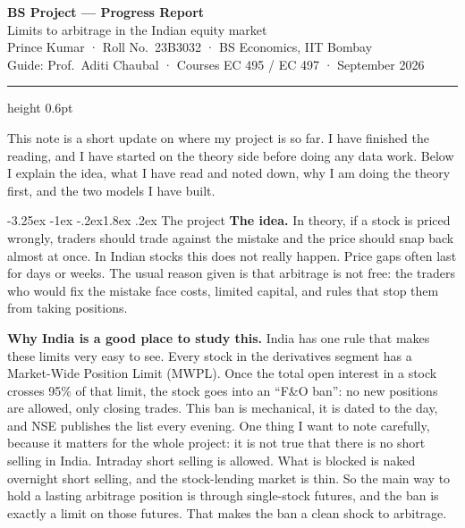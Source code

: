 \documentclass[11pt]{article}
\makeatletter
\renewcommand\section{\@startsection{section}{1}{\z@}%
  {-3.25ex \@plus -1ex \@minus -.2ex}{1.8ex \@plus.2ex}%
  {\normalfont\large\bfseries\color{owblue}}}
\makeatother
\begin{document}
\begin{center}
{\LARGE\bfseries\color{owblue} BS Project --- Progress Report}\\[4pt]
{\normalsize Limits to arbitrage in the Indian equity market}\\[6pt]
{\footnotesize Prince Kumar · Roll No.\ 23B3032 · BS Economics, IIT Bombay}\\[2pt]
{\footnotesize Guide: Prof.\ Aditi Chaubal · Courses EC 495 / EC 497 · September 2026}
\end{center}
\vspace{-4pt}
{\color{owgray}\hrule height 0.6pt}
\vspace{10pt}

\noindent This note is a short update on where my project is so far. I have finished the reading, and I have started on the theory side before doing any data work. Below I explain the idea, what I have read and noted down, why I am doing the theory first, and the two models I have built.

\section{The project}
\textbf{The idea.} In theory, if a stock is priced wrongly, traders should trade against the mistake and the price should snap back almost at once. In Indian stocks this does not really happen. Price gaps often last for days or weeks. The usual reason given is that arbitrage is not free: the traders who would fix the mistake face costs, limited capital, and rules that stop them from taking positions.

\textbf{Why India is a good place to study this.} India has one rule that makes these limits very easy to see. Every stock in the derivatives segment has a Market-Wide Position Limit (MWPL). Once the total open interest in a stock crosses 95\% of that limit, the stock goes into an ``F\&O ban'': no new positions are allowed, only closing trades. This ban is mechanical, it is dated to the day, and NSE publishes the list every evening. One thing I want to note carefully, because it matters for the whole project: it is not true that there is no short selling in India. Intraday short selling is allowed. What is blocked is naked overnight short selling, and the stock-lending market is thin. So the main way to hold a lasting arbitrage position is through single-stock futures, and the ban is exactly a limit on those futures. That makes the ban a clean shock to arbitrage.
\end{document}
